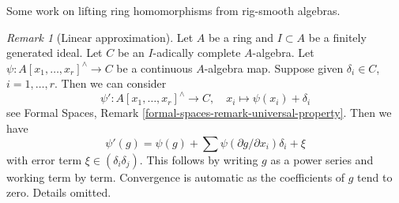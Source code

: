\documentclass{stacks-project}
\theoremstyle{plain}
\theoremstyle{definition}
\theoremstyle{remark}
\newtheorem{remark}[subsection]{Remark}
\numberwithin{equation}{subsection}
\begin{document}
\noindent
Some work on lifting ring homomorphisms from rig-smooth algebras.

\begin{remark}[Linear approximation]
\label{remark-linear-approximation}
Let $A$ be a ring and $I \subset A$ be a finitely generated ideal.
Let $C$ be an $I$-adically complete $A$-algebra.
Let $\psi : A[x_1, \ldots, x_r]^\wedge \to C$ be a continuous
$A$-algebra map. Suppose given $\delta_i \in C$, $i = 1, \ldots, r$.
Then we can consider
$$
\psi' : A[x_1, \ldots, x_r]^\wedge \to C,\quad
x_i \longmapsto \psi(x_i) + \delta_i
$$
see Formal Spaces, Remark \ref{formal-spaces-remark-universal-property}.
Then we have
$$
\psi'(g) = \psi(g) + \sum \psi(\partial g/\partial x_i)\delta_i + \xi
$$
with error term $\xi \in (\delta_i\delta_j)$. This follows by
writing $g$ as a power series and working term by term. Convergence
is automatic as the coefficients of $g$ tend to zero.
Details omitted.
\end{remark}
\end{document}
